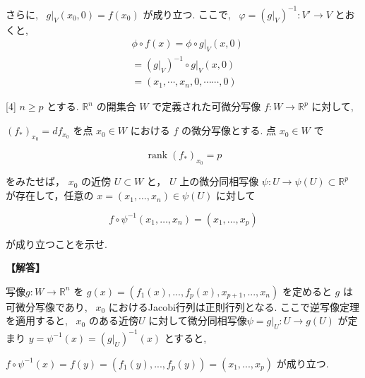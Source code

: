 \documentclass{jsarticle}
\begin{document}
さらに, \ $g|_V\left(x_{0}, 0\right)=f\left(x_{0}\right)$ が成り立つ.
ここで, \ $\varphi = (g|_V)^{-1} : V' \to V$ とおくと, \ 
$$
\begin{aligned}
& \phi \circ f(x)=\left.\phi \circ g\right|_{V}(x, 0) \\
& =\left(g |_V \right)^{-1} \circ g |_V (x, 0) \\
& =\left(x_{1}, \cdots, x_{n}, 0, \cdots \cdots, 0\right)
\end{aligned}
$$









\begin{itembox}[l]{[4]}
$n \geq p$ とする. 
$\mathbb{R}^{n}$ の開集合 $W$ で定義された可微分写像 $f: W \rightarrow \mathbb{R}^{p}$ に対して,  

$\left(f_{*}\right)_{x_{0}}=d f_{x_{0}}$ を点 $x_{0} \in W$ における $f$ の微分写像とする. 点 $x_{0} \in W$ で


\begin{equation*}
\operatorname{rank}\left(f_{*}\right)_{x_{0}}=p \tag{7}
\end{equation*}


をみたせば， $x_{0}$ の近傍 $U \subset W$ と， $U$ 上の微分同相写像 $\psi: U \rightarrow \psi(U) \subset \mathbb{R}^{p}$ が存在して，任意の $x=\left(x_{1}, \ldots, x_{n}\right) \in \psi(U)$ に対して


\begin{equation*}
f \circ \psi^{-1}\left(x_{1}, \ldots, x_{n}\right)=\left(x_{1}, \ldots, x_{p}\right) \tag{8}
\end{equation*}


が成り立つことを示せ.  
\end{itembox}

\noindent
\textbf{【解答】}

写像$g : W \to \mathbb{R}^n$ を $g(x) = (f_1 (x), ..., f_p (x), x_{p+1}, ..., x_n)$ を定めると $g$ は可微分写像であり, \ $x_0$ におけるJacobi行列は正則行列となる. ここで逆写像定理を適用すると, \ $x_0$ のある近傍$U$ に対して微分同相写像$\psi = g|_U : U \to g(U)$ が定まり $y = \psi^{-1}(x) = (g|_U)^{-1}(x)$ とすると, 

$f \circ \psi^{-1} (x) = f(y) = (f_1 (y), ..., f_p (y)) = (x_1, ..., x_p)$ が成り立つ.
\end{document}
